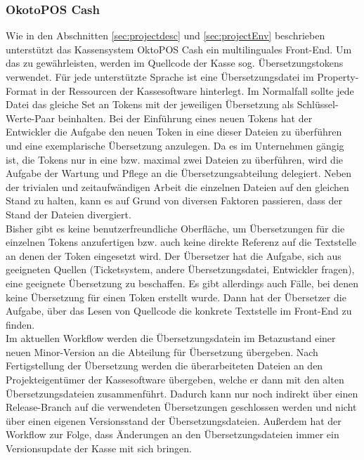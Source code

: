 \documentclass[10pt, oneside, ngerman]{article}
\begin{document}
  \subsubsection{OkotoPOS Cash}\label{sec:analyse:current:cash}
    Wie in den Abschnitten \ref{sec:projectdesc} und \ref{sec:projectEnv} beschrieben unterstützt das Kassensystem OktoPOS Cash ein multilinguales Front-End.
    Um das zu gewährleisten, werden im Quellcode der Kasse sog. Übersetzungstokens verwendet. Für jede unterstützte Sprache ist eine Übersetzungsdatei im Property-Format
    in der Ressourcen der Kassesoftware hinterlegt. Im Normalfall sollte jede Datei das gleiche Set an Tokens mit der jeweiligen Übersetzung als Schlüssel-Werte-Paar beinhalten. 
    Bei der Einführung eines neuen Tokens hat der Entwickler die Aufgabe den neuen Token in eine dieser Dateien zu überführen und eine exemplarische Übersetzung anzulegen.
    Da es im Unternehmen gängig ist, die Tokens nur in eine bzw. maximal zwei Dateien zu überführen, wird die Aufgabe der Wartung und Pflege an 
    die Übersetzungsabteilung delegiert. Neben der trivialen und zeitaufwändigen Arbeit die einzelnen Dateien auf den gleichen Stand zu halten,
    kann es auf Grund von diversen Faktoren passieren, dass der Stand der Dateien divergiert.\\
    Bisher gibt es keine benutzerfreundliche Oberfläche, um Übersetzungen für die einzelnen Tokens anzufertigen bzw. auch keine direkte Referenz auf die Textstelle 
    an denen der Token eingesetzt wird. Der Übersetzer hat die Aufgabe, sich aus geeigneten Quellen (Ticketsystem, andere Übersetzungsdatei, Entwickler fragen), eine geeignete Übersetzung
    zu beschaffen. Es gibt allerdings auch Fälle, bei denen keine Übersetzung für einen Token erstellt wurde. Dann hat der Übersetzer die Aufgabe, 
    über das Lesen von Quellcode die konkrete Textstelle im Front-End zu finden.\\
    Im aktuellen Workflow werden die Übersetzungsdatein im Betazustand einer neuen Minor-Version an die Abteilung für Übersetzung übergeben. Nach Fertigstellung
    der Übersetzung werden die überarbeiteten Dateien an den Projekteigentümer der Kassesoftware übergeben, welche er dann mit den alten Übersetzungsdateien zusammenführt.
    Dadurch kann nur noch indirekt über einen Release-Branch auf die verwendeten Übersetzungen geschlossen werden und nicht über einen eigenen Versionsstand der Übersetzungsdateien. 
    Außerdem hat der Workflow zur Folge, dass Änderungen an den Übersetzungsdateien immer ein Versionsupdate der Kasse mit sich bringen.\\
\end{document}
